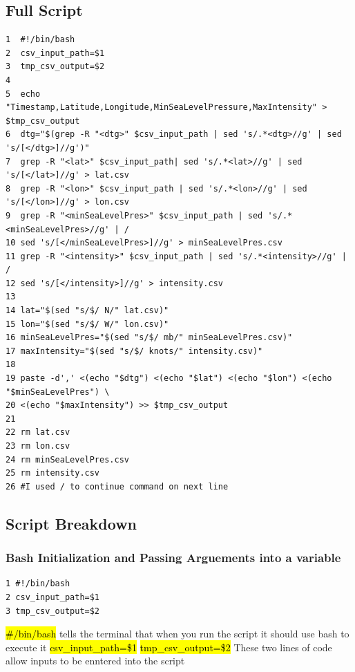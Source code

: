 \documentclass[]{article}
\begin{document}
\subsection{Full Script}
\begin{tcolorbox}[colback=white, colframe=black, boxrule=0.5pt, arc=2mm, 
    title=create\_csv.sh, width=6.7in, fonttitle=\bfseries, listing only, listing options={language=sh, basicstyle=\ttfamily}]
    \begin{verbatim}
1  #!/bin/bash
2  csv_input_path=$1
3  tmp_csv_output=$2
4
5  echo "Timestamp,Latitude,Longitude,MinSeaLevelPressure,MaxIntensity" > $tmp_csv_output
6  dtg="$(grep -R "<dtg>" $csv_input_path | sed 's/.*<dtg>//g' | sed 's/[</dtg>]//g')"
7  grep -R "<lat>" $csv_input_path| sed 's/.*<lat>//g' | sed 's/[</lat>]//g' > lat.csv
8  grep -R "<lon>" $csv_input_path | sed 's/.*<lon>//g' | sed 's/[</lon>]//g' > lon.csv
9  grep -R "<minSeaLevelPres>" $csv_input_path | sed 's/.*<minSeaLevelPres>//g' | /
10 sed 's/[</minSeaLevelPres>]//g' > minSeaLevelPres.csv
11 grep -R "<intensity>" $csv_input_path | sed 's/.*<intensity>//g' | / 
12 sed 's/[</intensity>]//g' > intensity.csv
13 
14 lat="$(sed "s/$/ N/" lat.csv)"
15 lon="$(sed "s/$/ W/" lon.csv)"
16 minSeaLevelPres="$(sed "s/$/ mb/" minSeaLevelPres.csv)"
17 maxIntensity="$(sed "s/$/ knots/" intensity.csv)"
18
19 paste -d',' <(echo "$dtg") <(echo "$lat") <(echo "$lon") <(echo "$minSeaLevelPres") \
20 <(echo "$maxIntensity") >> $tmp_csv_output
21
22 rm lat.csv
23 rm lon.csv
24 rm minSeaLevelPres.csv
25 rm intensity.csv
26 #I used / to continue command on next line
    \end{verbatim}
\end{tcolorbox}
\subsection{Script Breakdown}
\subsubsection{Bash Initialization and Passing Arguements into a variable}
\begin{tcolorbox}[colback=white, colframe=black, boxrule=0.5pt, arc=2mm, 
    title=First part of the code, width=6.7in, fonttitle=\bfseries, listing only, listing options={language=sh, basicstyle=\ttfamily}]
    \begin{verbatim}
1 #!/bin/bash
2 csv_input_path=$1
3 tmp_csv_output=$2
    \end{verbatim}
\hl{\#\!/bin/bash}\newline
tells the terminal that when you run the script it should use bash to execute it\newline
\hl{csv\_input\_path=\$1}\newline
\hl{tmp\_csv\_output=\$2}\newline
These two lines of code allow inputs to be enntered into the script
\end{tcolorbox}
\end{document}
